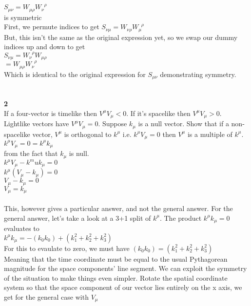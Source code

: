 \documentclass[prb,preprint]
{revtex4-1}
\newcommand{\PRLsep}{\noindent\makebox[\linewidth]{\resizebox{0.8888\linewidth}{2pt}{$\bullet$}}\bigskip}
\begin{document}
\\
$S_{\mu\nu} = W_{\mu\rho}W_\nu^{\;\;\rho}$
\\
is symmetric
\\
First, we permute indices to get
$S_{\nu\mu} = W_{\nu\rho}W_\mu^{\;\;\rho}$
\\
But, this isn't the same as the original expression yet, so we swap our dummy indices up and down to get 
\\
$S_{\nu\mu} = W_{\nu}^{\;\;\rho}W_{\mu\rho}$
\\
$= W_{\mu\rho} W_{\nu}^{\;\;\rho}$
\\
Which is identical to the original expression for $S_{\mu\nu}$ demonstrating symmetry.
\\
\PRLsep
\\
\\
\textbf{2}
\\
If a four-vector is timelike then $V^\mu V_\mu < 0$.  If it's spacelike then $V^\mu V_\mu > 0 $.  Lightlike vectors have $V^\mu V_\mu = 0$.  Suppose $k_\mu$ is a null vector.  Show that if a non-spacelike vector, $V^\mu$ is orthogonal to $k^\mu$ i.e. $k^\mu V_\mu = 0$ then $V^\mu$ is a multiple of $k^\mu$.
\\
$k^\mu V_\mu = 0 = k^\mu k_\mu$
\\
from the fact that $k_\mu$ is null.
\\
$k^\mu V_\mu - k^mu k_\mu = 0$
\\
$k^\mu\left(V_\mu - k_\mu\right) = 0$
\\
$V_\mu - k_\mu = 0$
\\
$V_\mu = k_\mu$
\\
\\
This, however gives a particular answer, and not the general answer.  For the general answer, let's take a look at a 3+1 split of $k^\mu$.  The product $k^\mu k_\mu = 0$ evaluates to 
\\
$k^\mu k_\mu = -\left(k_0 k_0\right) + \left(k_1^2 + k_2^2 + k_3^2\right)$
\\
For this to evaulate to zero, we must have 
$\left(k_0 k_0\right) = \left(k_1^2 + k_2^2 + k_3^2\right)$
\\
Meaning that the time coordinate must be equal to the usual Pythagorean magnitude for the space components' line segment.  We can exploit the symmetry of the situation to make things even simpler.  Rotate the spatial coordinate system so that the space component of our vector lies entirely on the x axis, we get for the general case with $V_\mu$
\\
\end{document}
